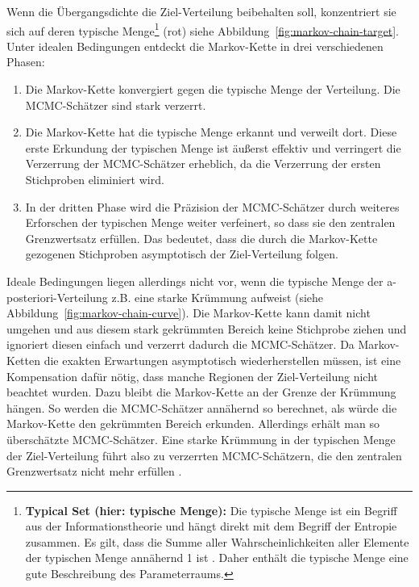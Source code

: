 \documentclass[ngerman]{ttlab-qualify}
\begin{document}
Wenn die Übergangsdichte die Ziel-Verteilung beibehalten soll, konzentriert sie sich auf deren typische Menge\footnote{\textbf{Typical Set (hier: typische Menge):} Die typische Menge ist ein Begriff aus der Informationstheorie und hängt direkt mit dem Begriff der Entropie zusammen. Es gilt, dass die Summe aller Wahrscheinlichkeiten aller Elemente der typischen Menge annähernd 1 ist \parencite{typical_set}. Daher enthält die typische Menge eine gute Beschreibung des Parameterraums.} (rot) siehe Abbildung~\ref{fig:markov-chain-target}. 
Unter idealen Bedingungen entdeckt die Markov-Kette in drei verschiedenen Phasen:
\begin{enumerate}
\item Die Markov-Kette konvergiert gegen die typische Menge der Verteilung. Die MCMC-Schätzer sind stark verzerrt.
\item Die Markov-Kette hat die typische Menge erkannt und verweilt dort. Diese erste Erkundung der typischen Menge ist äußerst effektiv und verringert die Verzerrung der MCMC-Schätzer erheblich, da die Verzerrung der ersten Stichproben eliminiert wird.
\item In der dritten Phase wird die Präzision der MCMC-Schätzer durch weiteres Erforschen der typischen Menge weiter verfeinert, so dass sie den zentralen Grenzwertsatz erfüllen. Das bedeutet, dass die durch die Markov-Kette gezogenen Stichproben asymptotisch der Ziel-Verteilung folgen.
\end{enumerate}

Ideale Bedingungen liegen allerdings nicht vor, wenn die typische Menge der a-posteriori-Verteilung z.B. eine starke Krümmung aufweist (siehe Abbildung~\ref{fig:markov-chain-curve}). Die Markov-Kette kann damit nicht umgehen und aus diesem stark gekrümmten Bereich keine Stichprobe ziehen und ignoriert diesen einfach und verzerrt dadurch die MCMC-Schätzer. 
Da Markov-Ketten die exakten Erwartungen asymptotisch wiederherstellen müssen, ist eine Kompensation dafür nötig, dass manche Regionen der Ziel-Verteilung nicht beachtet wurden. Dazu bleibt die Markov-Kette an der Grenze der Krümmung hängen. So werden die MCMC-Schätzer annähernd so berechnet, als würde die Markov-Kette den gekrümmten Bereich erkunden. Allerdings erhält man so überschätzte MCMC-Schätzer.
Eine starke Krümmung in der typischen Menge der Ziel-Verteilung führt also zu verzerrten MCMC-Schätzern, die den zentralen Grenzwertsatz nicht mehr erfüllen \parencite{betancourt:2017}.
\end{document}

